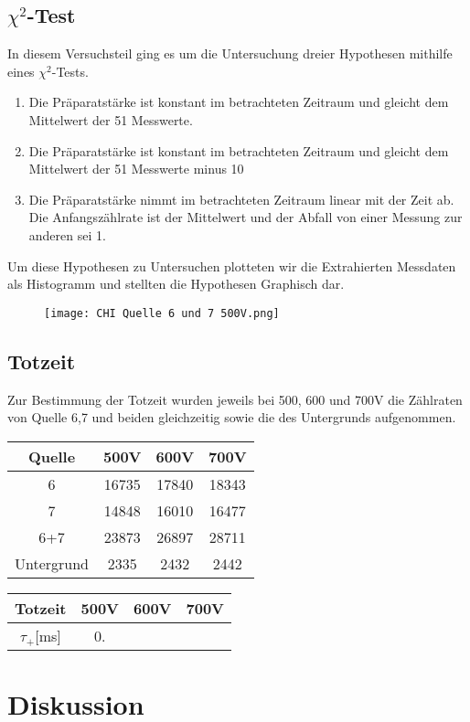 \documentclass{article}
\begin{document}
        \subsection{$\chi^2$-Test}
            In diesem Versuchsteil ging es um die Untersuchung dreier Hypothesen mithilfe eines $\chi^2$-Tests.
            \begin{enumerate}
                \item Die Präparatstärke ist konstant im betrachteten Zeitraum und gleicht dem Mittelwert der 51 Messwerte.
                \item Die Präparatstärke ist konstant im betrachteten Zeitraum und gleicht dem Mittelwert der 51 Messwerte minus 10%
                \item Die Präparatstärke nimmt im betrachteten Zeitraum linear mit der Zeit ab. Die Anfangszählrate ist der Mittelwert
                und der Abfall von einer Messung zur anderen sei 1.
            \end{enumerate}
            Um diese Hypothesen zu Untersuchen plotteten wir die Extrahierten Messdaten als Histogramm und stellten die Hypothesen Graphisch dar.
            \begin{figure}[H]
                \centering
                \texttt{[image: CHI Quelle 6 und 7 500V.png]}
                \label{fig:Messdaten und Hypothesen}
            \end{figure}

        \subsection{Totzeit}
            Zur Bestimmung der Totzeit wurden jeweils bei 500, 600 und 700V die Zählraten von Quelle 6,7 und beiden gleichzeitig
            sowie die des Untergrunds aufgenommen.
            \begin{center}
                \begin{tabular}{|c|c|c|c|}
                    \hline
                    Quelle & 500V & 600V & 700V \\
                    \hline
                    6 & 16735 & 17840 & 18343 \\
                    7 & 14848 & 16010 & 16477 \\
                    6+7 & 23873 & 26897 & 28711 \\
                    Untergrund & 2335 & 2432 & 2442 \\
                    \hline
                \end{tabular}
            \end{center}

            \begin{center}
                \begin{tabular}{|c|c|c|c|}
                    \hline
                    Totzeit & 500V & 600V & 700V \\
                    \hline
                    $\tau_+$[ms] & 0.

                \end{tabular}
            \end{center}

    \section{Diskussion}
\end{document}
